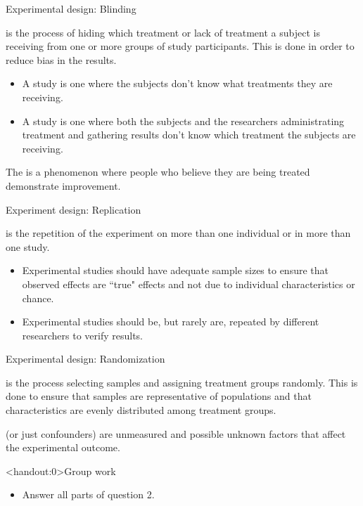 \documentclass[xcolor=table, aspectratio=169, bigger]{beamer}
\begin{document}
\begin{frame}{Experimental design: Blinding}
\begin{block}{}
 is the process of hiding which treatment or lack of treatment a subject is receiving from one or more groups of study participants. This is done in order to reduce bias in the results.

\begin{itemize}
\pause\item A  study is one where the subjects don't know what treatments they are receiving.

\pause\item A  study is one where both the subjects and the researchers administrating treatment and gathering results don't know which treatment the subjects are receiving.
\end{itemize}
\end{block}

\pause
\begin{block}{}
The  is a phenomenon where people who believe they are being treated demonstrate improvement.
\end{block}
\end{frame}

\begin{frame}{Experiment design: Replication}
\begin{block}{}
 is the repetition of the experiment on more than one individual or in more than one study.

\begin{itemize}
\pause\item Experimental studies should have adequate sample sizes to ensure that observed effects are ``true" effects and not due to individual characteristics or chance.
\pause\item Experimental studies should be, but rarely are, repeated by different researchers to verify results.
\end{itemize}
\end{block}
\end{frame}

\begin{frame}{Experimental design: Randomization}

\begin{block}{}
 is the process selecting samples and assigning treatment groups randomly. This is done to ensure that samples are representative of populations and that characteristics are evenly distributed among treatment groups.
\end{block}

\pause
\begin{block}{}
 (or just confounders) are unmeasured and possible unknown factors that affect the experimental outcome. 
\end{block}
\end{frame}

\begin{frame}<handout:0>{Group work}
\begin{block}{}
\begin{itemize}
\item Answer all parts of question 2.
\end{itemize}
\end{block}
\end{frame}
\end{document}

